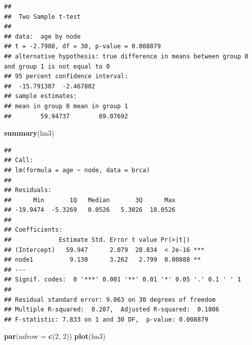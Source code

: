\documentclass[
  12pt,dutch]{book}
\newenvironment{Shaded}{\begin{snugshade}}{\end{snugshade}}
\newcommand{\AttributeTok}[1]{\textcolor[rgb]{0.13,0.29,0.53}{#1}}
\newcommand{\ConstantTok}[1]{\textcolor[rgb]{0.56,0.35,0.01}{#1}}
\newcommand{\DecValTok}[1]{\textcolor[rgb]{0.00,0.00,0.81}{#1}}
\newcommand{\FunctionTok}[1]{\textcolor[rgb]{0.13,0.29,0.53}{\textbf{#1}}}
\newcommand{\NormalTok}[1]{#1}
\newcommand{\OtherTok}[1]{\textcolor[rgb]{0.56,0.35,0.01}{#1}}
\newcommand{\SpecialCharTok}[1]{\textcolor[rgb]{0.81,0.36,0.00}{\textbf{#1}}}
\theoremstyle{definition}
\theoremstyle{definition}
\theoremstyle{definition}
\theoremstyle{definition}
\theoremstyle{remark}
\begin{document}
\begin{Shaded}
\end{Shaded}

\begin{verbatim}
## 
##  Two Sample t-test
## 
## data:  age by node
## t = -2.7988, df = 30, p-value = 0.008879
## alternative hypothesis: true difference in means between group 0 and group 1 is not equal to 0
## 95 percent confidence interval:
##  -15.791307  -2.467802
## sample estimates:
## mean in group 0 mean in group 1 
##        59.94737        69.07692
\end{verbatim}

\begin{Shaded}
\begin{Highlighting}[]
\FunctionTok{summary}\NormalTok{(lm3)}
\end{Highlighting}
\end{Shaded}

\begin{verbatim}
## 
## Call:
## lm(formula = age ~ node, data = brca)
## 
## Residuals:
##      Min       1Q   Median       3Q      Max 
## -19.9474  -5.3269   0.0526   5.3026  18.0526 
## 
## Coefficients:
##             Estimate Std. Error t value Pr(>|t|)    
## (Intercept)   59.947      2.079  28.834  < 2e-16 ***
## node1          9.130      3.262   2.799  0.00888 ** 
## ---
## Signif. codes:  0 '***' 0.001 '**' 0.01 '*' 0.05 '.' 0.1 ' ' 1
## 
## Residual standard error: 9.063 on 30 degrees of freedom
## Multiple R-squared:  0.207,  Adjusted R-squared:  0.1806 
## F-statistic: 7.833 on 1 and 30 DF,  p-value: 0.008879
\end{verbatim}

\begin{Shaded}
\begin{Highlighting}[]
\FunctionTok{par}\NormalTok{(}\AttributeTok{mfrow =} \FunctionTok{c}\NormalTok{(}\DecValTok{2}\NormalTok{, }\DecValTok{2}\NormalTok{))}
\FunctionTok{plot}\NormalTok{(lm3)}
\end{Highlighting}
\end{Shaded}
\end{document}
